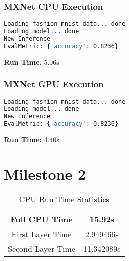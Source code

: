 \documentclass{article}
\begin{document}
\section{MXNet CPU Execution}
\begin{lstlisting}[language=bash]
Loading fashion-mnist data... done
Loading model... done
New Inference
EvalMetric: {'accuracy': 0.8236}
\end{lstlisting}

\textbf{Run Time.} 5.06s

\pagebreak
\section{MXNet GPU Execution}
\begin{lstlisting}[language=bash]
Loading fashion-mnist data... done
Loading model... done
New Inference
EvalMetric: {'accuracy': 0.8236}
\end{lstlisting}

\textbf{Run Time:} 4.40s

\part*{Milestone 2}
\setcounter{section}{0}

\begin{table}[H]
    \centering
    \begin{tabular}{c|c}
        Full CPU Time & 15.92s \\ \hline
        First Layer Time & 2.949466s \\ \hline
        Second Layer Time & 11.342089s
    \end{tabular}
    \caption{CPU Run Time Statistics}
\end{table}
\end{document}
